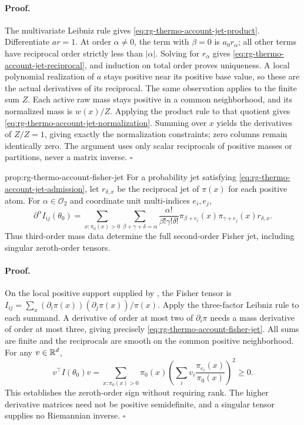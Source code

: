 \paragraph{Proof.}
The multivariate Leibniz rule gives
\cref{eq:rg-thermo-account-jet-product}. Differentiate $ar=1$.
At order $\alpha\ne0$, the term with $\beta=0$ is $a_0r_\alpha$;
all other terms have reciprocal order strictly less than $|\alpha|$.
Solving for $r_\alpha$ gives
\cref{eq:rg-thermo-account-jet-reciprocal}, and induction on total
order proves uniqueness. A local polynomial realization of $a$ stays
positive near its positive base value, so these are the actual derivatives
of its reciprocal. The same observation applies to the finite sum $Z$.
Each active raw mass stays positive in a common neighborhood, and its
normalized mass is $w(x)/Z$. Applying the product rule to that quotient
gives \cref{eq:rg-thermo-account-jet-normalization}. Summing over
$x$ yields the derivatives of $Z/Z=1$, giving exactly the normalization
constraints; zero columns remain identically zero. The argument uses only
scalar reciprocals of positive masses or partitions, never a matrix
inverse. $\square$

{prop:rg-thermo-account-fisher-jet}
For a probability jet satisfying
\cref{eq:rg-thermo-account-jet-admission}, let $r_{\delta,x}$ be the
reciprocal jet of $\pi(x)$ for each positive atom. For
$\alpha\in\mathcal O_2$ and coordinate unit multi-indices $e_i,e_j$,
\begin{equation}
 \partial^\alpha I_{ij}(\theta_0)
 =\sum_{x:\pi_0(x)>0}
   \sum_{\beta+\gamma+\delta=\alpha}
   \frac{\alpha!}{\beta!\gamma!\delta!}
   \pi_{\beta+e_i}(x)\pi_{\gamma+e_j}(x)r_{\delta,x}.
 \label{eq:rg-thermo-account-fisher-jet}
\end{equation}
Thus third-order mass data determine the full second-order Fisher jet,
including singular zeroth-order tensors.\thermoestablishedstatus


\paragraph{Proof.}
On the local positive support supplied by
, the Fisher tensor is
$I_{ij}=\sum_x(\partial_i\pi(x))(\partial_j\pi(x))/\pi(x)$.
Apply the three-factor Leibniz rule to each summand. A derivative of
order at most two of $\partial_i\pi$ needs a mass derivative of
order at most three, giving precisely
\cref{eq:rg-thermo-account-fisher-jet}. All sums are finite and the
reciprocals are smooth on the common positive neighborhood. For any
$v\in\mathbb R^d$,
\begin{equation}
 v^\top I(\theta_0)v
 =\sum_{x:\pi_0(x)>0}\pi_0(x)
       \left(\sum_i v_i\frac{\pi_{e_i}(x)}{\pi_0(x)}\right)^2
 \geq0.
 \label{eq:rg-thermo-account-fisher-gram}
\end{equation}
This establishes the zeroth-order sign without requiring rank. The
higher derivative matrices need not be positive semidefinite, and a
singular tensor supplies no Riemannian inverse. $\square$

